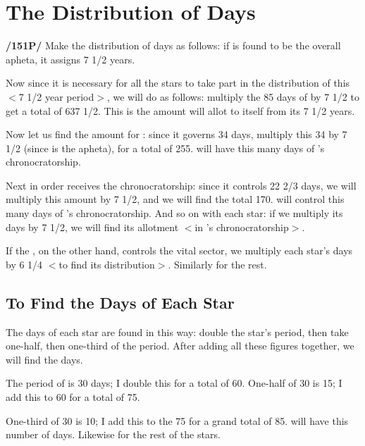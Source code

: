 \section{The Distribution of Days}

\textbf{/151P/} Make the distribution of days as follows: if \Saturn\xspace is found to be the overall apheta, it assigns 7 1/2 years.

Now since it is necessary for all the stars to take part in the distribution of this $<$7 1/2 year period$>$, we will do as follows: multiply the 85 days of \Saturn\xspace by 7 1/2 to get a total of 637 1/2. This is the amount \Saturn\xspace will allot to itself from its 7 1/2 years. 

Now let us find the amount for \Jupiter: since it governs 34 days, multiply this 34 by 7 1/2 (since \Saturn\xspace is the apheta), for a total of 255. \Jupiter\xspace will have this many days of \Saturn’s chronocratorship. 

Next in order \Venus\xspace receives the chronocratorship: since
it controls 22 2/3 days, we will multiply this amount by 7 1/2, and we will find the total 170. \Venus\xspace will control this many days of \Saturn’s chronocratorship. And so on with each star: if we multiply its days by 7 1/2, we will find its allotment $<$in \Saturn’s chronocratorship$>$. 

If the \Moon, on the other hand, controls the vital sector, we multiply each star’s days by 6 1/4 $<$to find its distribution$>$. Similarly for the rest.

\subsection{To Find the Days of Each Star}

The days of each star are found in this way: double the star’s period, then take one-half, then one-third of the period. 
After adding all these figures together, we will find the days. 

The period of \Saturn\xspace is 30 days; I double this for a total of 60. One-half of 30 is 15; I add this to 60 for a total of 75. 

One-third of 30 is 10; I add this to the 75 for a grand total of 85. \Saturn\xspace will have this number of days. Likewise for the rest of the stars.

\newpage